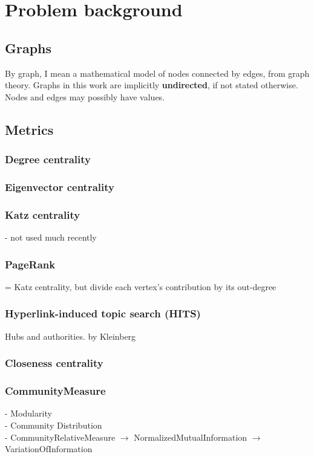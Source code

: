 \section{Problem background}

    \subsection{Graphs}
    
    By graph, I mean a mathematical model of nodes connected by edges, from graph theory. Graphs in this work are implicitly \textbf{undirected}, if not stated otherwise. Nodes and edges may possibly have values.
    
    \subsection{Metrics}
    
        \subsubsection{Degree centrality}
        \subsubsection{Eigenvector centrality}
        \subsubsection{Katz centrality}
        - not used much recently
        \subsubsection{PageRank}
        = Katz centrality, but divide each vertex's contribution by its out-degree
        \subsubsection{Hyperlink-induced topic search (HITS)}
        Hubs and authorities. by Kleinberg
        \subsubsection{Closeness centrality}
        
        \subsubsection{CommunityMeasure}
        - Modularity\\
        - Community Distribution\\
        - CommunityRelativeMeasure $\rightarrow$ NormalizedMutualInformation $\rightarrow$ VariationOfInformation
